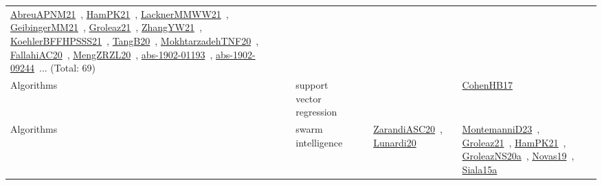{\begin{longtable}{lp{3cm}>{\raggedright\arraybackslash}p{6cm}>{\raggedright\arraybackslash}p{6cm}>{\raggedright\arraybackslash}p{8cm}}
\href{../works/AbreuAPNM21.pdf}{AbreuAPNM21}~\cite{AbreuAPNM21}, \href{../works/HamPK21.pdf}{HamPK21}~\cite{HamPK21}, \href{../works/LacknerMMWW21.pdf}{LacknerMMWW21}~\cite{LacknerMMWW21}, \href{../works/GeibingerMM21.pdf}{GeibingerMM21}~\cite{GeibingerMM21}, \href{../works/Groleaz21.pdf}{Groleaz21}~\cite{Groleaz21}, \href{../works/ZhangYW21.pdf}{ZhangYW21}~\cite{ZhangYW21}, \href{../works/KoehlerBFFHPSSS21.pdf}{KoehlerBFFHPSSS21}~\cite{KoehlerBFFHPSSS21}, \href{../works/TangB20.pdf}{TangB20}~\cite{TangB20}, \href{../works/MokhtarzadehTNF20.pdf}{MokhtarzadehTNF20}~\cite{MokhtarzadehTNF20}, \href{../works/FallahiAC20.pdf}{FallahiAC20}~\cite{FallahiAC20}, \href{../works/MengZRZL20.pdf}{MengZRZL20}~\cite{MengZRZL20}, \href{../works/abs-1902-01193.pdf}{abs-1902-01193}~\cite{abs-1902-01193}, \href{../works/abs-1902-09244.pdf}{abs-1902-09244}~\cite{abs-1902-09244}... (Total: 69)\\
Algorithms & support vector regression &  &  & \href{../works/CohenHB17.pdf}{CohenHB17}~\cite{CohenHB17}\\
Algorithms & swarm intelligence &  & \href{../works/ZarandiASC20.pdf}{ZarandiASC20}~\cite{ZarandiASC20}, \href{../works/Lunardi20.pdf}{Lunardi20}~\cite{Lunardi20} & \href{../works/MontemanniD23.pdf}{MontemanniD23}~\cite{MontemanniD23}, \href{../works/Groleaz21.pdf}{Groleaz21}~\cite{Groleaz21}, \href{../works/HamPK21.pdf}{HamPK21}~\cite{HamPK21}, \href{../works/GroleazNS20a.pdf}{GroleazNS20a}~\cite{GroleazNS20a}, \href{../works/Novas19.pdf}{Novas19}~\cite{Novas19}, \href{../works/Siala15a.pdf}{Siala15a}~\cite{Siala15a}\\

\end{longtable}}
